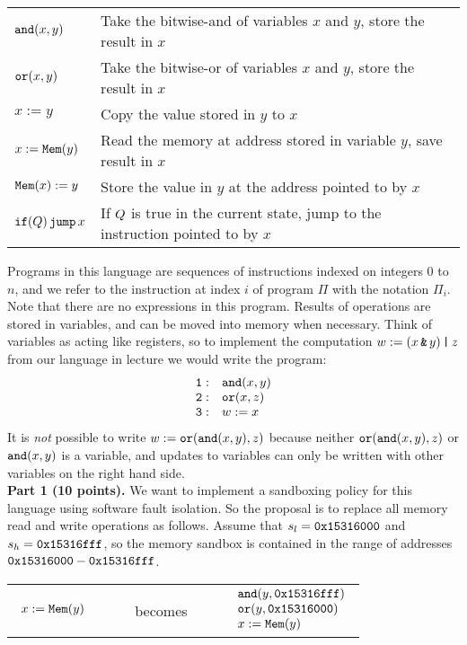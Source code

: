 \documentclass[10pt]{article}
\newcommand{\pand}[2]{\keywordfont{and}(#1, #2)}
\newcommand{\por}[2]{\keywordfont{or}(#1, #2)}
\begin{document}
\begin{enumerate}
\begin{center}
\begin{tabular}{ll}
$\pand{x}{y}$ & Take the bitwise-and of variables $x$ and $y$, store the result in $x$ \\
$\por{x}{y}$ & Take the bitwise-or of variables $x$ and $y$, store the result in $x$ \\
$x := y$ & Copy the value stored in $y$ to $x$ \\
$x := \texttt{\upshape Mem}(y)$ & Read the memory at address stored in variable $y$, save result in $x$ \\
$\texttt{\upshape Mem}(x) := y$ & Store the value in $y$ at the address pointed to by $x$ \\
$\texttt{\upshape if}(Q)\,\texttt{\upshape jump}\,x$ & If $Q$ is true in the current state, jump to the instruction pointed to by $x$
\end{tabular}
\end{center}

Programs in this language are sequences of instructions indexed on integers $0$ to $n$, and we refer to the instruction at index $i$ of program $\Pi$ with the notation $\Pi_i$. Note that there are no expressions in this program. Results of operations are stored in variables, and can be moved into memory when necessary. Think of variables as acting like registers, so to implement the computation $w := (x \operatorname{\texttt{\upshape \&}} y) \operatorname{\texttt{\upshape |}} z$ from our language in lecture we would write the program:
\[
\begin{array}{ll}
\keywordfont{1}: & \pand{x}{y} \\
\keywordfont{2}: & \por{x}{z} \\
\keywordfont{3}: & w := x
\end{array}
\]
It is \emph{not} possible to write $w := \por{\pand{x}{y}}{z}$ because neither $\por{\pand{x}{y}}{z}$ or $\pand{x}{y}$ is a variable, and updates to variables can only be written with other variables on the right hand side.
\\[1em]

\textbf{Part 1 (10 points).} We want to implement a sandboxing policy for this language using software fault isolation. So the proposal is to replace all memory read and write operations as follows. Assume that $s_l = \texttt{\upshape 0x15316000}$ and $s_h = \texttt{\upshape 0x15316fff}$, so the memory sandbox is contained in the range of addresses $\texttt{\upshape 0x15316000} - \texttt{\upshape 0x15316fff}$.
\begin{center}
\begin{tabular}{lcl}
$
\begin{array}{l}
x := \texttt{\upshape Mem}(y)
\end{array}
$
&
\ \ \ \ becomes\ \ \ \ 
&
$
\begin{array}{l}
\pand{y}{\keywordfont{0x15316fff}} \\
\por{y}{\keywordfont{0x15316000}} \\
x := \pderef{y}
\end{array}
$
\end{tabular}


\end{center}
\end{enumerate}
\end{document}
